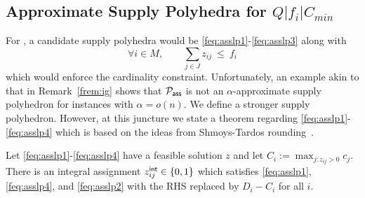 \subsection{Approximate Supply Polyhedra for $Q|f_i|C_{min}$}
For \cckp, a candidate supply polyhedra would be \eqref{feq:asslp1}-\eqref{feq:asslp3} along with
\begin{equation}
\textstyle \forall i\in M, \qquad \sum_{j\in J} z_{ij} ~\leq~ f_i \tag{A4} \label{feq:asslp4}
\end{equation}
which would enforce the cardinality constraint. Unfortunately, an example akin to that in Remark~\ref{frem:ig} shows that ${\cal P}_\mathsf{ass}$ is not
an $\alpha$-approximate supply polyhedron for \cckp instances with $\alpha = o(n)$. We define a stronger supply polyhedron.
However, at this juncture we state a theorem regarding \eqref{feq:asslp1}-\eqref{feq:asslp4} which
is based on the ideas from Shmoys-Tardos rounding~\cite{ShmoysT93}.
\begin{theorem}
	\label{fthm:shmoystardos}
	Let \eqref{feq:asslp1}-\eqref{feq:asslp4} have a feasible solution $z$ and let $C_i := \max_{j:z_{ij}>0} c_j$.
There is an integral assignment $z^{\mathsf{int}}_{ij}\in \{0,1\}$ which satisfies \eqref{feq:asslp1}, \eqref{feq:asslp4}, and \eqref{feq:asslp2} with the RHS replaced by $D_i - C_i$ for all $i$.
\end{theorem}
